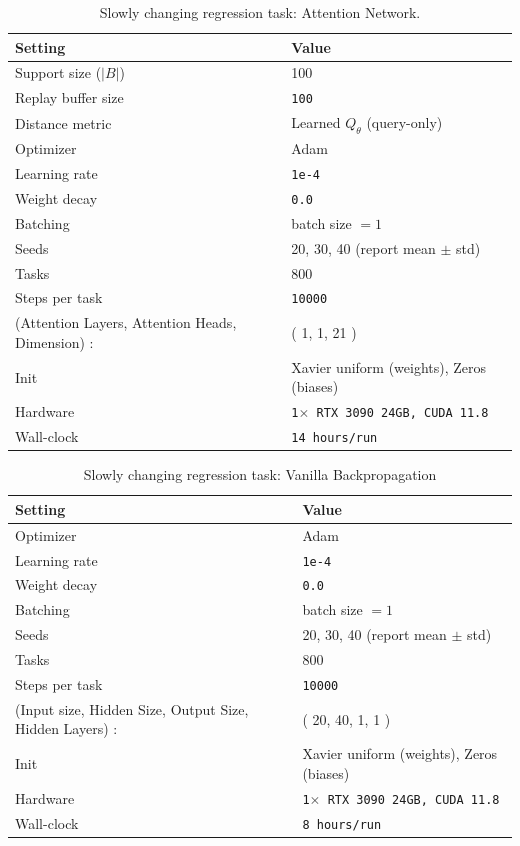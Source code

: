 \documentclass{article}
\begin{document}
\begin{table}[H]
\centering
\footnotesize
\caption{Slowly changing regression task: Attention Network.}
\label{tab:scr_attention}
\begin{tabular}{@{}ll@{}}
\toprule
Setting & Value \\ \midrule
Support size ($|B|$) & 100 \\
Replay buffer size & \texttt{100} \\
Distance metric & Learned $Q_{\theta}$ (query-only) \\
Optimizer & Adam \\
Learning rate & \texttt{1e-4} \\
Weight decay & \texttt{0.0} \\
Batching & batch size $=1$ \\
Seeds & 20, 30, 40 (report mean $\pm$ std) \\
Tasks & 800 \\
Steps per task & \texttt{10000} \\
(Attention Layers, Attention Heads, Dimension) : & ( 1, 1, 21 ) \\ 
Init & Xavier uniform (weights), Zeros (biases)\\
Hardware & \texttt{1$\times$ RTX 3090 24GB, CUDA 11.8} \\
Wall-clock & \texttt{14 hours/run} \\
\bottomrule
\end{tabular}
\end{table}


\begin{table}[H]
\centering
\footnotesize
\caption{Slowly changing regression task: Vanilla Backpropagation}
\label{tab:scr_bp}
\begin{tabular}{@{}ll@{}}
\toprule
Setting & Value \\ \midrule
Optimizer & Adam \\
Learning rate & \texttt{1e-4} \\
Weight decay & \texttt{0.0} \\
Batching & batch size $=1$ \\
Seeds & 20, 30, 40 (report mean $\pm$ std) \\
Tasks & 800 \\
Steps per task & \texttt{10000} \\
(Input size, Hidden Size, Output Size, Hidden Layers) : & ( 20, 40, 1, 1 ) \\ 
Init & Xavier uniform (weights), Zeros (biases)\\
Hardware & \texttt{1$\times$ RTX 3090 24GB, CUDA 11.8} \\
Wall-clock & \texttt{8 hours/run} \\
\bottomrule
\end{tabular}
\end{table}
\end{document}
